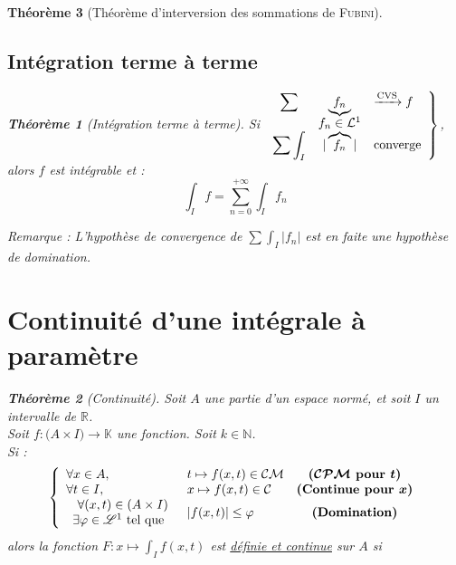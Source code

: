 \documentclass[11pt,a4paper]{report}
\newtheorem{theorem}{Théorème}[chapter]
\newtheorem{itheorem}[theorem]{Théorème}
\theoremstyle{definition}
\begin{document}
\begin{theorem}[Théorème d'interversion des sommations de \textsc{Fubini}]
{{\subsection{Intégration terme à terme} %
\label{sub:integration_terme_terme}
\begin{itheorem}[Intégration terme à terme]
\label{thm:integration_terme_terme}
    Si $
        \displaystyle
        \left.
        \begin{array}{c c l}
        \displaystyle\sum & \underbrace{f_n} & \xrightarrow{\text{CVS}} f \\
                     & f_n \in \mathcal{L}^1 & \\
        \displaystyle\sum  \int_I \! \vphantom{\overbrace{f_n}} & |\overbrace{f_n}| & \text{converge}
        \end{array}
        \right\rbrace$, alors $f$ est intégrable et :
        \begin{equation}
        \int_I f = \sum_{n=0}^{+\infty} \int_I f_n
        \end{equation}
\end{itheorem}
\emph{Remarque :} L'hypothèse de convergence de $\displaystyle\sum  \int_I |f_n|$ est en faite une hypothèse de domination.


\section{Continuité d'une intégrale à paramètre} %
\label{sec:continuite_d_une_integrale_parametre}
\begin{theorem}[Continuité]
     Soit $A$ une partie d'un espace normé, et soit $I$ un intervalle de \ensuremath{\mathbb{R}}.\\
     Soit $f : \big( A\times I\big) \longrightarrow \mathbb{K}$ une fonction. Soit $k\in \mathbb{N}$. \\ Si : 
\begin{equation}\left\lbrace
\begin{array}{l l c}
\forall x\in A,& t \mapsto f(x,t) \in \mathcal{CM}&\boldsymbol{( \mathcal{CPM} }\text{\textbf{ pour }}\boldsymbol{t)}\\
\forall t\in I,& x \mapsto f(x,t) \in \mathcal{C}&\text{\textbf{(Continue pour }}\boldsymbol{x)}\\
\begin{array}{r}
    \forall (x,t) \in (A\times I)\\
    \exists \varphi \in \mathscr{L}^{1}\text{ tel que } \\
\end{array}& |f(x,t)|\le \varphi&\text{\textbf{(Domination)}}\\
\end{array}
\right.
\end{equation}
alors la fonction $F : x \mapsto \int_I f(x,t)$ est \uline{\emph{définie et continue}} sur $A$ si 
\end{theorem}

}}
\end{theorem}
\end{document}
